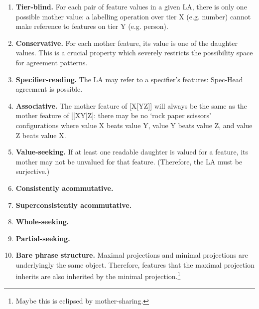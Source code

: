 \begin{enumerate}
    \item \textbf{Tier-blind.} For each pair of feature values in a given LA, there is only one possible mother value: a labelling operation over tier X (e.g. number) cannot make reference to features on tier Y (e.g. person). 

    \item \textbf{Conservative.} For each mother feature, its value is one of the daughter values. This is a crucial property which severely restricts the possibility space for agreement patterns. 

    \item \textbf{Specifier-reading.} The LA may refer to a specifier's features: Spec-Head agreement is possible.

    \item \textbf{Associative.} The mother feature of [X[YZ]] will always be the same as the mother feature of [[XY]Z]: there may be no `rock paper scissors' configurations where value X beats value Y, value Y beats value Z, and value Z beats value X. 

    \item \textbf{Value-seeking.} If at least one readable daughter is valued for a feature, its mother may not be unvalued for that feature. (Therefore, the LA must be surjective.)

    \item \textbf{Consistently acommutative.}

    \item \textbf{Superconsistently acommutative.}

    \item \textbf{Whole-seeking.}

    \item \textbf{Partial-seeking.}

    \item \textbf{Bare phrase structure.} Maximal projections and minimal projections are underlyingly the same object. Therefore, features that the maximal projection inherits are also inherited by the minimal projection.\footnote{Maybe this is eclipsed by mother-sharing.}




\end{enumerate}
